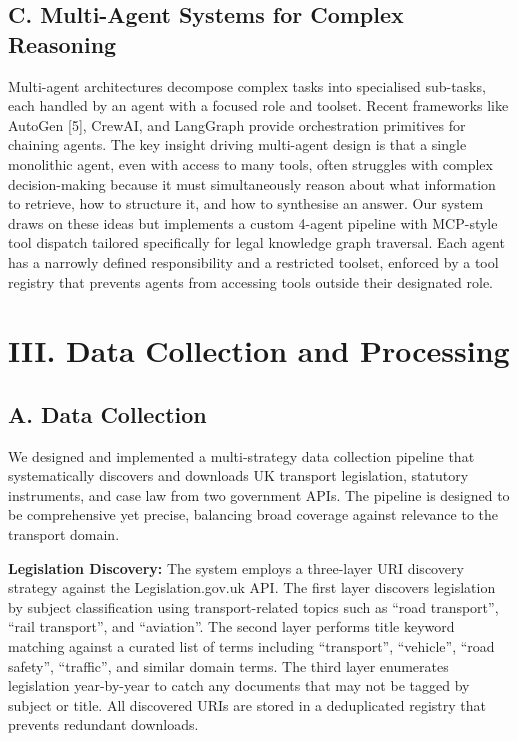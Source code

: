 \documentclass[10pt, a4paper, twocolumn]{article}
\begin{document}
\subsection{C. Multi-Agent Systems for Complex Reasoning}
Multi-agent architectures decompose complex tasks into specialised sub-tasks, each handled by an agent with a focused role and toolset. Recent frameworks like AutoGen [5], CrewAI, and LangGraph provide orchestration primitives for chaining agents. The key insight driving multi-agent design is that a single monolithic agent, even with access to many tools, often struggles with complex decision-making because it must simultaneously reason about what information to retrieve, how to structure it, and how to synthesise an answer. Our system draws on these ideas but implements a custom 4-agent pipeline with MCP-style tool dispatch tailored specifically for legal knowledge graph traversal. Each agent has a narrowly defined responsibility and a restricted toolset, enforced by a tool registry that prevents agents from accessing tools outside their designated role.

\section{III. Data Collection and Processing}

\subsection{A. Data Collection}
We designed and implemented a multi-strategy data collection pipeline that systematically discovers and downloads UK transport legislation, statutory instruments, and case law from two government APIs. The pipeline is designed to be comprehensive yet precise, balancing broad coverage against relevance to the transport domain.

\textbf{Legislation Discovery:} The system employs a three-layer URI discovery strategy against the Legislation.gov.uk API. The first layer discovers legislation by subject classification using transport-related topics such as ``road transport'', ``rail transport'', and ``aviation''. The second layer performs title keyword matching against a curated list of terms including ``transport'', ``vehicle'', ``road safety'', ``traffic'', and similar domain terms. The third layer enumerates legislation year-by-year to catch any documents that may not be tagged by subject or title. All discovered URIs are stored in a deduplicated registry that prevents redundant downloads.
\end{document}
